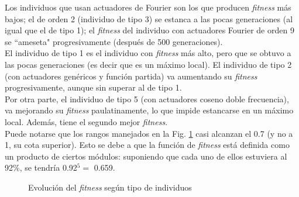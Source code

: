 \documentclass{article}
\begin{document}
Los individuos que usan actuadores de Fourier son los que producen \textit{fitness} m\'as bajos; el de orden 2 (individuo de tipo 3) se estanca a las pocas generaciones (al igual que el de tipo 1); el \textit{fitness} del individuo con actuadores Fourier de orden 9 se ``ameseta" progresivamente (despu\'es de 500 generaciones).\\
El individuo de tipo 1 es el individuo con \textit{fitness} m\'as alto, pero que se obtuvo a las pocas generaciones (es decir que es un m\'aximo local). El individuo de tipo 2 (con actuadores gen\'ericos y funci\'on partida) va aumentando su \textit{fitness} progresivamente, aunque sin superar al de tipo 1.\\
Por otra parte, el individuo de tipo 5 (con actuadores coseno doble frecuencia), va mejorando su \textit{fitness} paulatinamente, lo que impide estancarse en un m\'aximo local. Adem\'as, tiene el segundo mejor \textit{fitness}.\\
Puede notarse que los rangos manejados en la Fig. \ref{fig:resultados_fitness} casi alcanzan el 0.7 (y no a 1, su cota superior). Esto se debe a que la funci\'on de \textit{fitness} est\'a definida como un producto de ciertos m\'odulos: suponiendo que cada uno de ellos estuviera al 92\%, se tendr\'ia  0.92$^5 =$ 0.659.
\begin{figure}[H]%
  \centering
  \caption{Evoluci\'on del \textit{fitness} seg\'un tipo de individuos}%
  \label{fig:resultados_fitness} %
\end{figure}
\end{document}
